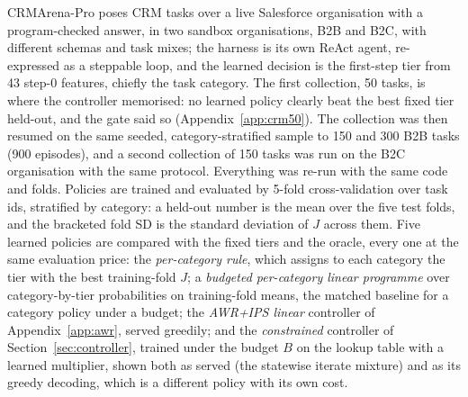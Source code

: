 \documentclass[10pt]{article}
\begin{document}
CRMArena-Pro \citep{crmarenapro2025} poses CRM tasks over a live Salesforce organisation with a program-checked answer, in two sandbox organisations, B2B and B2C, with different schemas and task mixes; the harness is its own ReAct agent, re-expressed as a steppable loop, and the learned decision is the first-step tier from 43 step-0 features, chiefly the task category. The first collection, 50 tasks, is where the controller memorised: no learned policy clearly beat the best fixed tier held-out, and the gate said so (Appendix~\ref{app:crm50}). The collection was then resumed on the same seeded, category-stratified sample to 150 and 300 B2B tasks (900 episodes), and a second collection of 150 tasks was run on the B2C organisation with the same protocol. Everything was re-run with the same code and folds. Policies are trained and evaluated by 5-fold cross-validation over task ids, stratified by category: a held-out number is the mean over the five test folds, and the bracketed fold SD is the standard deviation of $J$ across them. Five learned policies are compared with the fixed tiers and the oracle, every one at the same evaluation price: the \emph{per-category rule}, which assigns to each category the tier with the best training-fold $J$; a \emph{budgeted per-category linear programme} over category-by-tier probabilities on training-fold means, the matched baseline for a category policy under a budget; the \emph{AWR+IPS linear} controller of Appendix~\ref{app:awr}, served greedily; and the \emph{constrained} controller of Section~\ref{sec:controller}, trained under the budget $B$ on the lookup table with a learned multiplier, shown both as served (the statewise iterate mixture) and as its greedy decoding, which is a different policy with its own cost.
\end{document}
